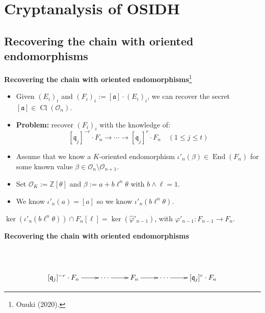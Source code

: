 \documentclass[10pt]{beamer}
\theoremstyle{plain}
\theoremstyle{definition}
\newcommand{\Z}{\mathbb{Z}}
\newcommand{\mO}{\mathcal{O}}
\renewcommand{\(}{\left(}
\renewcommand{\)}{\right)}
\newcommand{\mf}[1]{\mathfrak{#1}}
\newcommand{\mfq}{\mathfrak{q}}
\DeclareMathOperator{\End}{End}
\DeclareMathOperator{\Cl}{Cl}
\begin{document}
\section{Cryptanalysis of OSIDH}

\subsection{Recovering the chain with oriented endomorphisms}

\begin{frame}
\textbf{Recovering the chain with oriented endomorphisms}\footnote[frame]{Onuki (2020).}

\vspace{0.5cm}

\begin{itemize}
\item Given $(E_i)_{i}$ and $(F_i)_{i}:=[\mf{a}]\cdot(E_i)_{i}$, we can recover the secret $[\mf{a}]\in\Cl(\mO_n)$.

\pause

\item \textbf{Problem:} recover $(F_i)_{i}$ with the knowledge of:
\[[\mfq_j]^{-r}\cdot F_{n}\longrightarrow \cdots\longrightarrow [\mfq_j]^{r}\cdot F_{n} \quad (1\leq j\leq t)\]

\pause

\item Assume that we know a $K$-oriented endomorphism $\iota'_n(\beta)\in\End(F_n)$ for some known value $\beta\in\mO_n\setminus\mO_{n+1}$.

\pause

\item Set $\mO_K:=\Z[\theta]$ and $\beta:=a+b\ell^n\theta$ with $b\wedge\ell=1$.

\item We know $\iota'_n(a)=[a]$ so we know $\iota'_n(b\ell^n\theta)$.
\end{itemize}

\pause

\begin{lemma}
$\ker(\iota'_n(b\ell^n\theta))\cap F_n[\ell]=\ker(\widehat{\varphi}'_{n-1})$, with $\varphi'_{n-1}:F_{n-1}\longrightarrow F_n$.
\end{lemma}

\end{frame}

\begin{frame}
\textbf{Recovering the chain with oriented endomorphisms}

\vspace{0.5cm}

\[\xymatrix{
 										      &                     &  & &\\
[\mf{q}_j]^{-r}\cdot F_n \ar[r] & \cdots \ar[r]& F_n \ar[r] & \cdots \ar[r]& [\mf{q}_j]^r\cdot F_n\\
}\]
\end{frame}
\end{document}
